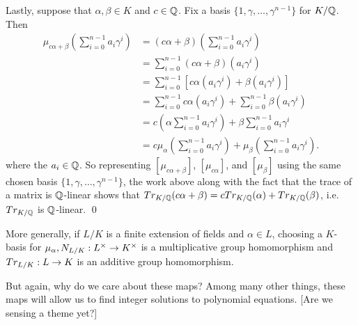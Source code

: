Lastly, suppose that $\alpha, \beta \in K$ and $c \in \mathbb{Q}$. Fix a basis $\{1, \gamma, \ldots, \gamma^{n-1} \}$ for $K/\mathbb{Q}$. Then
	\[
	\begin{split}
	\mu_{c\alpha + \beta}\left(\sum_{i=0}^{n-1} a_i \gamma^i \right)&= (c\alpha + \beta) \left(\sum_{i=0}^{n-1} a_i \gamma^i \right) \\
	&= \sum_{i=0}^{n-1} (c\alpha + \beta)(a_i \gamma^i) \\
	&= \sum_{i=0}^{n-1} \left[ c\alpha (a_i \gamma^i) + \beta (a_i \gamma^i) \right] \\
	&=  \sum_{i=0}^{n-1} c\alpha (a_i \gamma^i) + \sum_{i=0}^{n-1} \beta (a_i \gamma^i) \\
	&= c \left(\alpha \sum_{i=0}^{n-1} a_i \gamma^i \right) + \beta \sum_{i=0}^{n-1} a_i \gamma^i \\
	&= c\mu_{\alpha} \left( \sum_{i=0}^{n-1} a_i \gamma^i \right) + \mu_\beta \left( \sum_{i=0}^{n-1} a_i \gamma^i \right).
	\end{split}
	\]
where the $a_i \in \mathbb{Q}$. So representing $[\mu_{c\alpha+\beta}]$, $[\mu_{c\alpha}]$, and $[\mu_\beta]$ using the same chosen basis $\{1, \gamma, \ldots, \gamma^{n-1} \}$, the work above along with the fact that the trace of a matrix is $\mathbb{Q}$-linear shows that $Tr_{K/\mathbb{Q}}(c\alpha+ \beta)= cTr_{K/\mathbb{Q}}(\alpha) + Tr_{K/\mathbb{Q}}(\beta)$, i.e. $Tr_{K/\mathbb{Q}}$ is $\mathbb{Q}$-linear. \qed \pskip


\begin{rem}
More generally, if $L/K$ is a finite extension of fields and $\alpha \in L$, choosing a $K$-basis for $\mu_\alpha, N_{L/K}: L^\times \to K^\times$ is a multiplicative group homomorphism and $Tr_{L/K}: L \to K$ is an additive group homomorphism. 
\end{rem}


But again, why do we care about these maps? Among many other things, these maps will allow us to find integer solutions to polynomial equations. [Are we sensing a theme yet?] 


